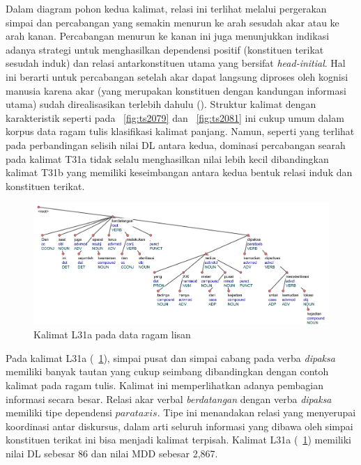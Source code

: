 Dalam diagram pohon kedua kalimat, relasi ini terlihat melalui pergerakan simpai dan percabangan yang semakin menurun ke arah sesudah akar atau ke arah kanan. Percabangan menurun ke kanan ini juga menunjukkan indikasi adanya strategi untuk menghasilkan dependensi positif (konstituen terikat sesudah induk) dan relasi antarkonstituen utama yang bersifat \textit{head-initial}. Hal ini berarti untuk percabangan setelah akar dapat langsung diproses oleh kognisi manusia karena akar (yang merupakan konstituen dengan kandungan informasi utama) sudah direalisasikan terlebih dahulu (\citealp{tesniere1959elements, wang2017effects}). Struktur kalimat dengan karakteristik seperti pada \pic~\ref{fig:ts2079} dan \pic~\ref{fig:ts2081} ini cukup umum dalam korpus data ragam tulis klasifikasi kalimat panjang. Namun, seperti yang terlihat pada perbandingan selisih nilai DL antara kedua, dominasi percabangan searah pada kalimat T31a tidak selalu menghasilkan nilai lebih kecil dibandingkan kalimat T31b yang memiliki keseimbangan antara kedua bentuk relasi induk dan konstituen terikat. 

\begin{figure}
	\centering \includegraphics[width=1
	\textwidth] {pics/ls1716.jpg} 
	\caption{Kalimat L31a pada data ragam lisan} 
	\label{fig:ls1716} 
\end{figure}

Pada kalimat L31a (\pic~\ref{fig:ls1716}), simpai pusat dan simpai cabang pada verba \textit{dipaksa} memiliki banyak tautan yang cukup seimbang dibandingkan dengan contoh kalimat pada ragam tulis. Kalimat ini memperlihatkan adanya pembagian informasi secara besar. Relasi akar verbal \textit{berdatangan} dengan verba \textit{dipaksa} memiliki tipe dependensi $parataxis$. Tipe ini menandakan relasi yang menyerupai koordinasi antar diskursus, dalam arti seluruh informasi yang dibawa oleh simpai konstituen terikat ini bisa menjadi kalimat terpisah. Kalimat L31a (\pic~\ref{fig:ls1716}) memiliki nilai DL sebesar 86 dan nilai MDD sebesar 2,867. 

